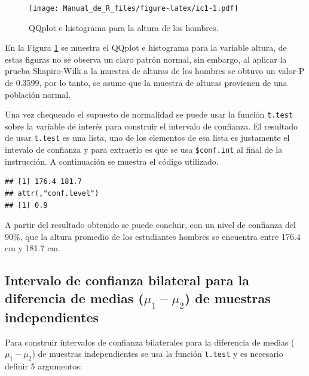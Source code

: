 \documentclass[10pt,]{krantz}
\makeatletter
\newenvironment{Shaded}{\begin{snugshade}}{\end{snugshade}}
\newcommand{\KeywordTok}[1]{\textcolor[rgb]{0.13,0.29,0.53}{\textbf{{#1}}}}
\newcommand{\DataTypeTok}[1]{\textcolor[rgb]{0.13,0.29,0.53}{{#1}}}
\newcommand{\FloatTok}[1]{\textcolor[rgb]{0.00,0.00,0.81}{{#1}}}
\newcommand{\NormalTok}[1]{{#1}}
\newenvironment{kframe}{%
\medskip{}
\setlength{\fboxsep}{.8em}
 \def\at@end@of@kframe{}%
 \ifinner\ifhmode%
  \def\at@end@of@kframe{\end{minipage}}%
  \begin{minipage}{\columnwidth}%
 \fi\fi%
 \def\FrameCommand##1{\hskip\@totalleftmargin \hskip-\fboxsep
 \colorbox{shadecolor}{##1}\hskip-\fboxsep
     \hskip-\linewidth \hskip-\@totalleftmargin \hskip\columnwidth}%
 \MakeFramed {\advance\hsize-\width
   \@totalleftmargin\z@ \linewidth\hsize
   \@setminipage}}%
 {\par\unskip\endMakeFramed%
 \at@end@of@kframe}
\renewenvironment{Shaded}{\begin{kframe}}{\end{kframe}}
\makeatother
\begin{document}
\begin{figure}[htbp]
\centering
\texttt{[image: Manual\_de\_R\_files/figure-latex/ic1-1.pdf]}
\caption{\label{fig:ic1}QQplot e histograma para la altura de los hombres.}
\end{figure}

En la Figura \ref{fig:ic1} se muestra el QQplot e histograma para la
variable altura, de estas figuras no se observa un claro patrón normal,
sin embargo, al aplicar la prueba Shapiro-Wilk a la muestra de alturas
de los hombres se obtuvo un valor-P de 0.3599, por lo tanto, se asume
que la muestra de alturas provienen de una población normal.

Una vez chequeado el supuesto de normalidad se puede usar la función
\texttt{t.test} sobre la variable de interés para construir el intervalo
de confianza. El resultado de usar \texttt{t.test} es una lista, uno de
los elementos de esa lista es justamente el intevalo de confianza y para
extraerlo es que se usa \texttt{\$conf.int} al final de la instrucción.
A continuación se muestra el código utilizado.

\begin{Shaded}
\end{Shaded}

\begin{verbatim}
## [1] 176.4 181.7
## attr(,"conf.level")
## [1] 0.9
\end{verbatim}

A partir del resultado obtenido se puede concluir, con un nivel de
confianza del 90\%, que la altura promedio de los estudiantes hombres se
encuentra entre 176.4 cm y 181.7 cm.

\subsection{\texorpdfstring{Intervalo de confianza bilateral para la
diferencia de medias (\(\mu_1-\mu_2\)) de muestras
independientes}{Intervalo de confianza bilateral para la diferencia de medias (\textbackslash{}mu\_1-\textbackslash{}mu\_2) de muestras independientes}}\label{intervalo-de-confianza-bilateral-para-la-diferencia-de-medias-mu_1-mu_2-de-muestras-independientes}

Para construir intervalos de confianza bilaterales para la diferencia de
medias (\(\mu_1-\mu_2\)) de muestras independientes se usa la función
\texttt{t.test} y es necesario definir 5 argumentos:
\end{document}
